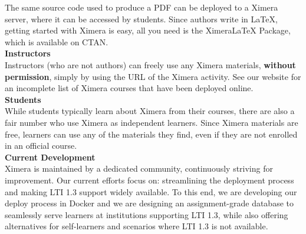 \documentclass{article}
\begin{document}
\begin{multicols}{2}
\begin{center}
\begin{tikzpicture}
        \end{tikzpicture}
    \end{center}
    The same source code used to produce a PDF can be deployed to a Ximera
    server, where it can be accessed by students. Since authors write in
    \LaTeX, getting started with Ximera is easy, all you need is the
    XimeraLaTeX
    Package, which is available on CTAN.
    \\[.5cm]
    {\sffamily\bfseries Instructors}\\
    Instructors (who are not authors) can freely use any Ximera materials,
    \textbf{without permission}, simply by using the URL of the
    Ximera activity. See our website for an incomplete list of Ximera
    courses that have been
    deployed online.
    \\[.5cm]\columnbreak
    {\sffamily\bfseries Students}\\
    While students typically learn about Ximera from their courses, there are
    also a fair number who use Ximera as independent learners.
    Since Ximera materials are free, learners can use any of the materials they
    find, even if they are not enrolled in an official course.
    \\[.5cm]
    {\sffamily\bfseries Current Development}\\
    Ximera is maintained by a dedicated community, continuously striving for
    improvement. Our current efforts focus on: streamlining the deployment
    process and   making LTI 1.3 support widely available. To this end, we are
    developing our
    deploy process in Docker and we are designing an assignment-grade database
    to
    seamlessly serve  learners at institutions supporting LTI 1.3, while also
    offering
    alternatives for self-learners and scenarios where LTI 1.3 is not
    available.
    \begin{center}
    \end{center}


\end{multicols}
\end{document}
